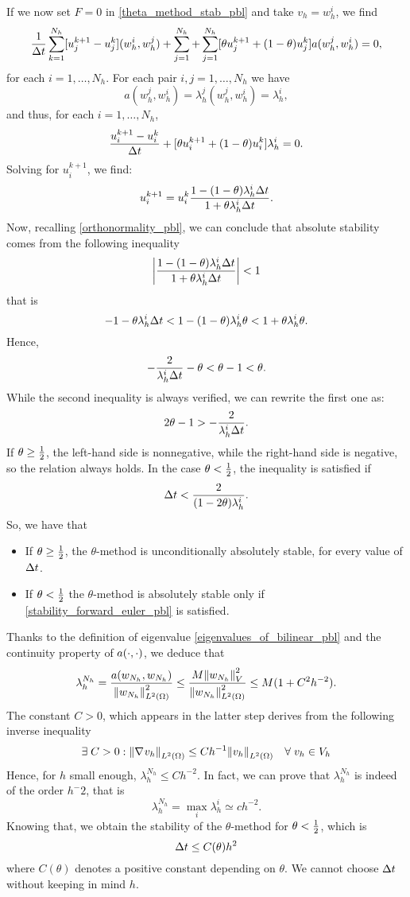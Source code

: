 If we now set \(F=0\) in \eqref{theta_method_stab_pbl} and take \(v_h = w_h^i\), we find 
\[
    \frac{1}{\Delta t} \sum_{k=1}^{N_h} [u_j^{k+1} - u_j^k](w_h^i, w_h^j) + \sum_{j=1}^{N_h} + \sum_{j=1}^{N_h}[\theta u_j^{k+1} + (1-\theta)u_j^k]a(w_h^j, w_h^i) = 0,
\]
for each \(i = 1,\ldots, N_h\). For each pair \(i,j = 1, \ldots, N_h\) we have 
\[
    a(w_h^j, w_h^i) = \lambda^j_h (w_h^j, w_h^i) = \lambda^i_h,
\]
and thus, for each \(i = 1,\ldots, N_h\), 
\[
    \frac{u_i^{k+1} - u^k_i}{\Delta t} + [\theta u^{k+1}_i + (1-\theta)u^k_i] \lambda_h^i = 0.
\]
Solving for \(u^{k+1}_i\), we find:
\[
    u_i^{k+1} = u_i^k \frac{1-(1-\theta) \lambda_h^i \Delta t}{1+\theta \lambda_h^i\Delta t}.
\]
Now, recalling \eqref{orthonormality_pbl}, we can conclude that absolute stability comes from the following inequality
\[
    \abs{\frac{1-(1-\theta) \lambda_h^i \Delta t}{1+\theta \lambda_h^i\Delta t}} < 1
\]
that is 
\[
    -1-\theta \lambda_h^i \Delta t < 1 - (1-\theta) \lambda_h^i \theta < 1+\theta \lambda_h^i \theta.
\]
Hence, 
\[
    -\frac{2}{\lambda_h^i \Delta t} -\theta < \theta -1 < \theta.
\]
While the second inequality is always verified, we can rewrite the first one as: 
\[
    2\theta - 1 > -\frac{2}{\lambda_h^i \Delta t}. 
\]
If \(\theta \geq \frac{1}{2}\), the left-hand side is nonnegative, while the right-hand side is negative, so the relation always holds. In the case \(\theta < \frac{1}{2}\), the inequality is satisfied if 
\begin{equation}
    \Delta t < \frac{2}{(1-2\theta) \lambda_h^i}.
    \label{stability_forward_euler_pbl}
\end{equation}
So, we have that 
\begin{itemize}
    \item If \(\theta \geq \frac{1}{2}\), the \(\theta\)-method is unconditionally absolutely stable, for every value of \(\Delta t\).
    \item If \(\theta < \frac{1}{2}\) the \(\theta\)-method is absolutely stable only if \eqref{stability_forward_euler_pbl} is satisfied.
\end{itemize}
Thanks to the definition of eigenvalue \eqref{eigenvalues_of_bilinear_pbl} and the continuity property of \(a(\cdot, \cdot)\), we deduce that 
\[
    \lambda_h^{N_h} = \frac{a(w_{N_h}, w_{N_h})}{\norm{w_{N_h}}_{L^2(\Omega)}^2} \leq \frac{M\norm{w_{N_h}}_V^2}{\norm{w_{N_h}}_{L^2(\Omega)}^2} \leq M(1+C^2h^{-2}).
\]
The constant \(C > 0\), which appears in the latter step derives from the following inverse inequality 
\[
    \exists \; C > 0 : \norm{\nabla\mspace{1mu} v_h}_{L^2(\Omega)} \leq Ch^{-1} \norm{v_h}_{L^2(\Omega)} \quad \forall \; v_h \in V_h
\]
Hence, for \(h\) small enough, \(\lambda_h^{N_h} \leq Ch^{-2}\). In fact, we can prove that \(\lambda^{N_h}_h\) is indeed of the order \(h^-2\), that is \
\[
    \lambda_h^{N_h} = \max_i \lambda_h^i \simeq ch^{-2}. 
\]
Knowing that, we obtain the stability of the \(\theta\)-method for \(\theta < \frac{1}{2}\), which is 
\begin{equation}
    \Delta t \leq C(\theta) h^2
    \label{forward_euler_stab_pbl}
\end{equation}
where \(C(\theta)\) denotes a positive constant depending on \(\theta\). We cannot choose \(\Delta t\) without keeping in mind \(h\).

